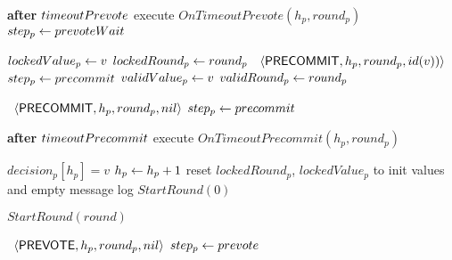 \begin{algorithm}[htb!]
\begin{algorithmic}[1]
\SPACE
{} \label{line:tab:recvAny2/3Prevote}
	\STATE \textbf{after} $timeoutPrevote$ execute $OnTimeoutPrevote(h_p, round_p)$ \label{line:tab:timeoutPrevote}
		\STATE $step_p \leftarrow prevoteWait$ \label{line:tab:setStateToPrevoteWait} 
\ENDUPON

\SPACE
{} \label{line:tab:recvPrevote}
	\STATE $lockedValue_p \leftarrow v$                \label{line:tab:setLockedValue}
	\STATE $lockedRound_p \leftarrow round_p$   \label{line:tab:setLockedRound} 
	\STATE \Broadcast \ $\langle\mathsf{PRECOMMIT},h_p,round_p,id(v))\rangle$  \label{line:tab:precommit-v}	
	\STATE $step_p \leftarrow precommit$ \label{line:tab:setStateToCommit}
	\ENDIF
	\STATE $validValue_p \leftarrow v$                          \label{line:tab:setValidRound}
	\STATE $validRound_p \leftarrow round_p$             \label{line:tab:setValidValue}
\ENDUPON

\SHORTSPACE
{}
	\STATE \Broadcast \ $\langle\mathsf{PRECOMMIT},h_p,round_p, nil\rangle$   \label{line:tab:precommit-v-1}
	\STATE $step_p \leftarrow precommit$
\ENDUPON

\SPACE
{} \label{line:tab:startTimeoutPrecommit}
	\STATE \textbf{after} $timeoutPrecommit$ execute $OnTimeoutPrecommit(h_p, round_p)$
\ENDUPON 

\SPACE
{} \label{line:tab:onDecideRule} 
 \label{line:tab:validDecisionValue}
	\STATE $decision_p[h_p] = v$   \label{line:tab:decide} 
	\STATE$h_p \leftarrow h_p + 1$  \label{line:tab:increaseHeight} 
	\STATE reset $lockedRound_p$, $lockedValue_p$ to init values and empty message log 
	\STATE $StartRound(0)$   	
\ENDIF
\ENDUPON

\SHORTSPACE
{} \label{line:tab:skipRounds}
\STATE $StartRound(round)$ \label{line:tab:nextRound2}
\ENDUPON

\SHORTSPACE
{} \label{line:tab:onTimeoutPropose}
\STATE \Broadcast \ $\langle\mathsf{PREVOTE},h_p,round_p, nil\rangle$  \label{line:tab:prevote-nil-on-timeout}	
\STATE $step_p \leftarrow prevote$
\ENDIF	
\ENDFUNCTION


\end{algorithmic}
\end{algorithm}
